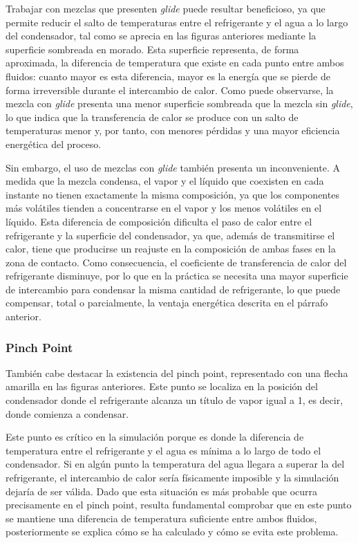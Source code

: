 \documentclass[../main.tex]{subfiles}
\begin{document}
Trabajar con mezclas que presenten \textit{glide} puede resultar beneficioso, ya que permite reducir el salto de temperaturas entre el refrigerante y el agua a lo largo del condensador, tal como se aprecia en las figuras anteriores mediante la superficie sombreada en morado. Esta superficie representa, de forma aproximada, la diferencia de temperatura que existe en cada punto entre ambos fluidos: cuanto mayor es esta diferencia, mayor es la energía que se pierde de forma irreversible durante el intercambio de calor. Como puede observarse, la mezcla con \textit{glide} presenta una menor superficie sombreada que la mezcla sin \textit{glide}, lo que indica que la transferencia de calor se produce con un salto de temperaturas menor y, por tanto, con menores pérdidas y una mayor eficiencia energética del proceso.

Sin embargo, el uso de mezclas con \textit{glide} también presenta un inconveniente. A medida que la mezcla condensa, el vapor y el líquido que coexisten en cada instante no tienen exactamente la misma composición, ya que los componentes más volátiles tienden a concentrarse en el vapor y los menos volátiles en el líquido. Esta diferencia de composición dificulta el paso de calor entre el refrigerante y la superficie del condensador, ya que, además de transmitirse el calor, tiene que producirse un reajuste en la composición de ambas fases en la zona de contacto. Como consecuencia, el coeficiente de transferencia de calor del refrigerante disminuye, por lo que en la práctica se necesita una mayor superficie de intercambio para condensar la misma cantidad de refrigerante, lo que puede compensar, total o parcialmente, la ventaja energética descrita en el párrafo anterior.

\subsubsection{Pinch Point}

También cabe destacar la existencia del pinch point, representado con una flecha amarilla en las figuras anteriores. Este punto se localiza en la posición del condensador donde el refrigerante alcanza un título de vapor igual a 1, es decir, donde comienza a condensar.

Este punto es crítico en la simulación porque es donde la diferencia de temperatura entre el refrigerante y el agua es mínima a lo largo de todo el condensador. Si en algún punto la temperatura del agua llegara a superar la del refrigerante, el intercambio de calor sería físicamente imposible y la simulación dejaría de ser válida. Dado que esta situación es más probable que ocurra precisamente en el pinch point, resulta fundamental comprobar que en este punto se mantiene una diferencia de temperatura suficiente entre ambos fluidos, posteriormente se explica cómo se ha calculado y cómo se evita este problema.
\end{document}
